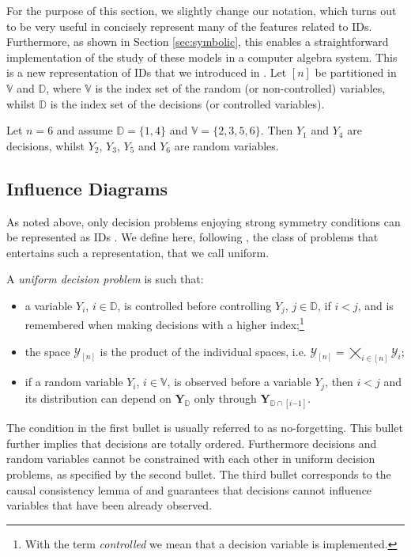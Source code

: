 For the purpose of this section, we slightly change our notation, which turns out to be very useful in concisely represent many of the features related to IDs. Furthermore, as shown in Section \ref{sec:symbolic}, this enables a straightforward implementation of the study of these models in a computer algebra system. This is a new representation of IDs that we introduced in \citet{Leonelli2015a}. Let $[n]$ be partitioned in $\mathbb{V}$ and $\mathbb{D}$, where $\mathbb{V}$ is the index set of the random (or non-controlled) variables, whilst $\mathbb{D}$ is the index set of the decisions (or controlled variables). 

\begin{example}
Let $n=6$ and assume $\mathbb{D}=\{1,4\}$ and $\mathbb{V}=\{2,3,5,6\}$. Then $Y_1$ and $Y_4$ are decisions, whilst $Y_2$, $Y_3$, $Y_5$ and $Y_6$ are random variables. 
\end{example}

\subsection{Influence Diagrams}
\label{sec:id}
As noted above, only decision problems enjoying strong symmetry conditions can be represented as IDs \citep{Howard1983,Howard2005a, Jensen2009, Shachter1986,Shachter1989a,Smith2010}. We define here, following \citep{Smith2008e,Smith2010}, the class of problems that entertains such a representation, that we call uniform.
\begin{definition}
\label{def:udp}
A  \emph{uniform decision problem} is such that:
\begin{itemize}
\item a variable $Y_i$, $i\in \mathbb{D}$, is controlled before controlling $Y_j$, $j\in \mathbb{D}$, if $i<j$, and is remembered when making decisions with a higher index;\footnote{With the term \textit{controlled} we mean that a decision variable is implemented.}
\item the space $\bm{\mathcal{Y}}_{[n]}$ is the product of the individual spaces, i.e. $\bm{\mathcal{Y}}_{[n]}=\bigtimes_{i\in[n]}\mathcal{Y}_i$;
\item if a random variable $Y_i$, $i\in\mathbb{V}$, is observed before a variable $Y_j$, then $i<j$ and its distribution can depend  on $\bm{Y}_\mathbb{D}$ only through $\bm{Y}_{\mathbb{D}\cap[i{-1}]}$.
\end{itemize}
\end{definition}
The condition in the first bullet is usually referred to as no-forgetting. This bullet further implies that decisions are totally ordered. Furthermore decisions and random variables cannot be constrained with each other in uniform decision problems, as specified by the second bullet. The third bullet corresponds to the causal consistency lemma of \citet{Cowell1999a} and guarantees that decisions cannot influence variables that have been already observed.

